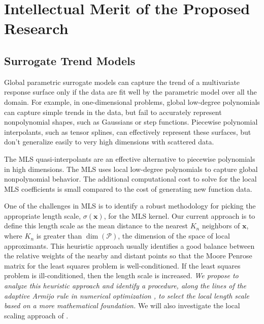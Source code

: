 \documentclass[11pt]{NSFamsart}
\newcommand{\bx}{{\boldsymbol{x}}}
\newcommand{\calp}{{\mathcal{P}}}
\begin{document}
\section{Intellectual Merit of the Proposed Research} \label{sec:Proposed}


\subsection{Surrogate Trend Models} \label{sec:ourtrend}
Global parametric surrogate models can capture the trend of a multivariate response surface only if the data are fit well by the parametric model over all the domain. For example, in one-dimensional problems, global low-degree polynomials can capture simple trends in the data, but fail to accurately represent nonpolynomial shapes, such as Gaussians or step functions. Piecewise polynomial interpolants, such as tensor splines, can effectively represent these surfaces, but don't generalize easily to very high dimensions with scattered data. 

The MLS quasi-interpolants are an effective alternative to piecewise polynomials in high dimensions. The MLS uses local low-degree polynomials to capture global nonpolynomial behavior. The additional computational cost to solve for the local MLS coefficients is small compared to the cost of generating new function data. 

One of the challenges in MLS is to identify a robust methodology for picking the appropriate length scale, $\sigma(\bx)$, for the MLS kernel. Our current approach is to define this length scale as the mean distance to the nearest $K_n$ neighbors of $\bx$, where $K_n$ is greater than $\dim(\calp)$, the dimension of the space of local approximants.
This heuristic approach usually identifies a good balance between the relative weights of the nearby and distant points so that the Moore Penrose matrix for the least squares problem is well-conditioned. If the least squares problem is ill-conditioned, then the length scale is increased. \emph{We propose to analyze this heuristic approach and identify a procedure, along the lines of the adaptive Armijo rule in numerical optimization \cite{kelley1999iterative}, to select the local length scale based on a more mathematical foundation.}  We will also investigate the local scaling approach of \cite{zelnik2004self}.
\end{document}
